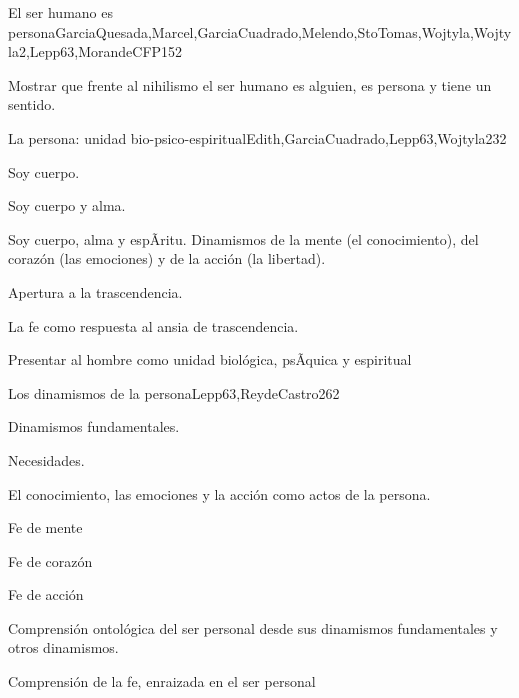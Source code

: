 \begin{syllabus}
\begin{unit}{El ser humano es persona}{GarciaQuesada,Marcel,GarciaCuadrado,Melendo,StoTomas,Wojtyla,Wojtyla2,Lepp63,MorandeCFP}{15}{2}
\begin{unitgoals}
	\item Mostrar que frente al nihilismo el ser humano es alguien, es persona y tiene un sentido.
\end{unitgoals}
\end{unit}

\begin{unit}{La persona: unidad bio-psico-espiritual}{Edith,GarciaCuadrado,Lepp63,Wojtyla2}{3}{2}
\begin{topics}
 		\item Soy cuerpo.
 		\item Soy cuerpo y alma.
 		\item Soy cuerpo, alma y espÃ­ritu.  Dinamismos de la mente (el conocimiento), del corazón (las emociones) y de la acción (la libertad).
 		\item Apertura a la trascendencia.
 		\item La fe como respuesta al ansia de trascendencia.
\end{topics}

\begin{unitgoals}
	\item Presentar al hombre como unidad biológica, psÃ­quica y espiritual
\end{unitgoals}
\end{unit}

\begin{unit}{Los dinamismos de la persona}{Lepp63,ReydeCastro2}{6}{2}
\begin{topics}
 	 		\item Dinamismos fundamentales.
 	 		\item Necesidades.
 	 		\item El conocimiento, las emociones y la acción como actos de la persona.
 	 		\item Fe de mente
 	 		\item Fe de corazón
 	 		\item Fe de acción
\end{topics}

\begin{unitgoals}
	\item Comprensión ontológica del ser personal desde sus dinamismos fundamentales y otros dinamismos.
	\item Comprensión de la fe, enraizada en el ser personal

\end{unitgoals}
\end{unit}


\end{syllabus}
